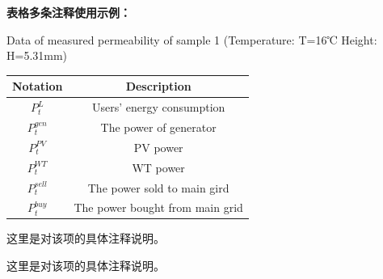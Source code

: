 \textbf{表格多条注释使用示例：}
\begin{table}[htbp]
{Data of measured permeability of sample 1 (Temperature: T=16℃ Height: H=5.31mm)} %
\label{notation} 
\begin{threeparttable}  %
\begin{tabularx}{\textwidth}{ C{0.4} C{0.6}}
    \toprule[1.5pt]
        Notation & Description   \\  
    \midrule[1pt]
        $P_{t}^L$ & Users' energy consumption \\ 
        $P_t^{gen}$ & The power of generator\\
        $P_t^{PV}$ & PV power \\ 
        $P_t^{WT}$ & WT power  \\
        $P_t^{sell}$ & The power sold to main gird \\ 
        $P_t^{buy}$ & The power bought from main grid \\
    \bottomrule[1.5pt]
\end{tabularx}
\begin{tablenotes}  %
    \footnotesize  %
    \item[1] 这里是对该项的具体注释说明。 %
    \item[2] 这里是对该项的具体注释说明。 %
\end{tablenotes}   %
\end{threeparttable}  %
\end{table}



